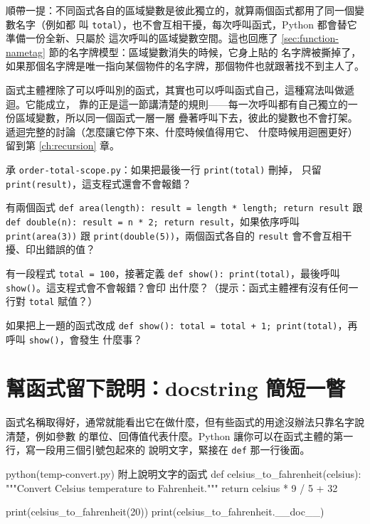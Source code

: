 順帶一提：不同函式各自的區域變數是彼此獨立的，就算兩個函式都用了同一個變數名字（例如都
叫 \texttt{total}），也不會互相干擾，每次呼叫函式，Python 都會替它準備一份全新、只屬於
這次呼叫的區域變數空間。這也回應了 \ref{sec:function-nametag} 節的名字牌模型：區域變數消失的時候，它身上貼的
名字牌被撕掉了，如果那個名字牌是唯一指向某個物件的名字牌，那個物件也就跟著找不到主人了。

函式主體裡除了可以呼叫別的函式，其實也可以呼叫函式自己，這種寫法叫做遞迴。它能成立，
靠的正是這一節講清楚的規則——每一次呼叫都有自己獨立的一份區域變數，所以同一個函式一層一層
疊著呼叫下去，彼此的變數也不會打架。遞迴完整的討論（怎麼讓它停下來、什麼時候值得用它、
什麼時候用迴圈更好）留到第 \ref{ch:recursion} 章。

\begin{drills}[label=drills:scope]
\item 承 \texttt{order-total-scope.py}：如果把最後一行 \texttt{print(total)} 刪掉，
只留 \texttt{print(result)}，這支程式還會不會報錯？
\item 有兩個函式 \texttt{def area(length): result = length * length; return result} 跟
\texttt{def double(n): result = n * 2; return result}，如果依序呼叫
\texttt{print(area(3))} 跟 \texttt{print(double(5))}，兩個函式各自的 \texttt{result}
會不會互相干擾、印出錯誤的值？
\item 有一段程式 \texttt{total = 100}，接著定義
\texttt{def show(): print(total)}，最後呼叫 \texttt{show()}。這支程式會不會報錯？會印
出什麼？（提示：函式主體裡有沒有任何一行對 \texttt{total} 賦值？）
\item 如果把上一題的函式改成
\texttt{def show(): total = total + 1; print(total)}，再呼叫 \texttt{show()}，會發生
什麼事？
\end{drills}

\section{幫函式留下說明：docstring 簡短一瞥}
\label{sec:function-docstring}

函式名稱取得好，通常就能看出它在做什麼，但有些函式的用途沒辦法只靠名字說清楚，例如參數
的單位、回傳值代表什麼。Python 讓你可以在函式主體的第一行，寫一段用三個引號包起來的
說明文字，緊接在 \texttt{def} 那一行後面。

\begin{example}{python}{(temp-convert.py) 附上說明文字的函式}
def celsius_to_fahrenheit(celsius):
    """Convert Celsius temperature to Fahrenheit."""
    return celsius * 9 / 5 + 32


print(celsius_to_fahrenheit(20))
print(celsius_to_fahrenheit.__doc__)
\end{example}

